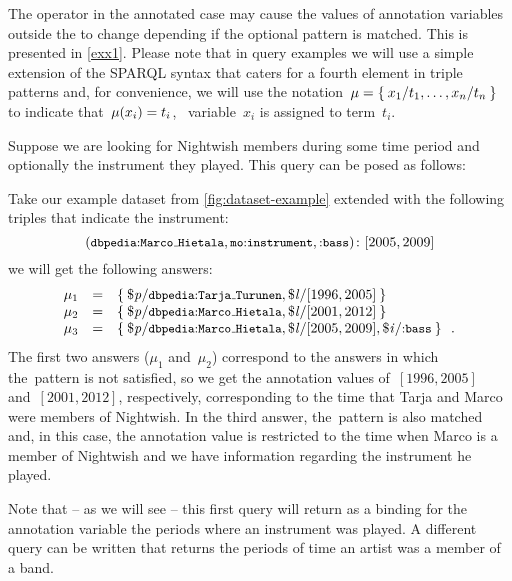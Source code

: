 \nd The \OPTIONAL operator in the annotated case may cause the values of annotation variables outside the \OPTIONAL to
change depending if the optional pattern is matched.  This is presented in \cref{exx1}.
%
Please note that in query examples we will use a simple extension of the SPARQL syntax that caters for a fourth element
in triple patterns and, for convenience, we will use the notation~$\mu = \left\{\:x_{1}/t_{1}, \ldots, x_{n}/t_{n}\:\right\}$ to
indicate that~$\mathit{\mu}\!\left(x_{i}\right) = t_{i}$, \ie~variable~$x_{i}$ is assigned to term~$t_{i}$.

\begin{example}
  \label{exx1}
  Suppose we are looking for Nightwish members during some time period and optionally the instrument they played.  This
  query can be posed as follows:
  
  Take our example dataset from \cref{fig:dataset-example} extended with the following triples that indicate the
  instrument:
    \[
    \fuzzyg{\triple{\qname{dbpedia}{Marco\mathunderscore{}Hietala}, \qname{mo}{instrument}, \qname{}{bass}}}{[2005,2009]} 
    \]
  we will get the following answers: 
    \[
    \begin{array}{lcl}
      \mu_{1} & = & \set{\var{p}/\qname{dbpedia}{Tarja\mathunderscore{}Turunen}, \var{l}/[1996, 2005]} \\
      \mu_{2} & = & \set{\var{p}/\qname{dbpedia}{Marco\mathunderscore{}Hietala}, \var{l}/[2001, 2012]} \\
      \mu_{3} & = & \set{\var{p}/\qname{dbpedia}{Marco\mathunderscore{}Hietala}, \var{l}/[2005, 2009], \var{i}/\qname{}{bass} } \enspace .
    \end{array}
    \]
    The first two answers ($\mu_{1}$ and~$\mu_{2}$) correspond to the answers in which the~\OPTIONAL pattern is not
    satisfied, so we get the annotation values of~$[1996, 2005]$ and~$[2001, 2012]$, respectively, corresponding to the
    time that Tarja and Marco were members of Nightwish.  In the third answer, the~\OPTIONAL pattern is also matched
    and, in this case, the annotation value is restricted to the time when Marco is a member of Nightwish and we have
    information regarding the instrument he played.
\end{example}
%
Note that -- as we will see -- this first query will return as a binding for the annotation variable  the periods
where an instrument was played.
%
A different query can be written that returns the periods of time an artist was a member of a band.

